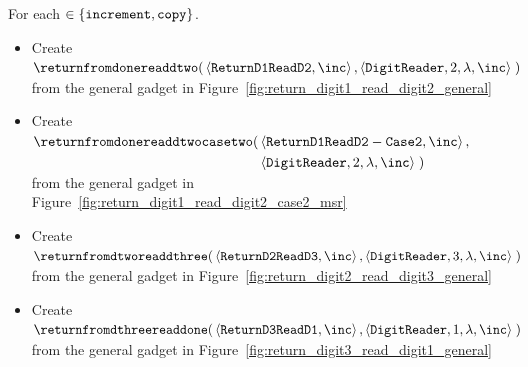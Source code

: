 


\noindent For each {\inc} $\in \{ {\tt increment, copy } \}$.
\begin{itemize}
    \item Create
    $\begin{aligned}[t]
        \returnfromdonereaddtwo(& \left \langle {\tt ReturnD1ReadD2},          \inc \right\rangle,
                                  \left \langle {\tt DigitReader}, 2, \lambda, \inc \right\rangle \;)
    \end{aligned}$ \\ from the general gadget in Figure~\ref{fig:return_digit1_read_digit2_general}

    \item Create
    $\begin{aligned}[t]
        \returnfromdonereaddtwocasetwo(& \left\langle {\tt ReturnD1ReadD2-Case2},    \inc \right\rangle, \\
                                       & \left\langle {\tt DigitReader}, 2, \lambda, \inc \right\rangle \;)
    \end{aligned}$ \\ from the general gadget in Figure~\ref{fig:return_digit1_read_digit2_case2_msr}

    \item Create
    $\begin{aligned}[t]
        \returnfromdtworeaddthree(& \left\langle {\tt ReturnD2ReadD3},           \inc \right\rangle,
                                    \left\langle {\tt DigitReader},  3, \lambda, \inc \right\rangle \;)
    \end{aligned}$ \\ from the general gadget in Figure~\ref{fig:return_digit2_read_digit3_general}

    \item Create
    $\begin{aligned}[t]
            \returnfromdthreereaddone(& \left \langle {\tt ReturnD3ReadD1},           \inc \right\rangle,
                                        \left \langle {\tt DigitReader},  1, \lambda, \inc \right\rangle \;)
    \end{aligned}$ \\ from the general gadget in Figure~\ref{fig:return_digit3_read_digit1_general}

\end{itemize}



